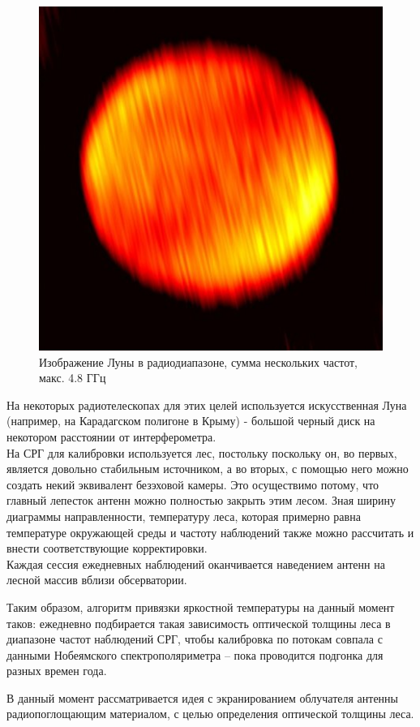 \begin{figure}[H]
	\centering
	\includegraphics[width=0.7\linewidth]{images/moon_radio}
	\caption{Изображение Луны в радиодиапазоне, сумма нескольких частот, макс. 4.8 ГГц}
	\label{fig:moon_radio}
\end{figure}

На некоторых радиотелескопах для этих целей используется искусственная Луна (например, на Карадагском полигоне в Крыму) - большой черный диск на некотором расстоянии от интерферометра.\\ На СРГ для калибровки используется лес, постольку поскольку он, во первых, является довольно стабильным источником, а во вторых, с помощью него можно создать некий эквивалент безэховой камеры. Это осуществимо потому, что главный лепесток антенн можно полностью закрыть этим лесом. Зная ширину диаграммы направленности, температуру леса, которая примерно равна температуре окружающей среды и частоту наблюдений также можно рассчитать и внести соответствующие корректировки.\\
Каждая сессия ежедневных наблюдений оканчивается наведением антенн на лесной массив вблизи обсерватории.

Таким образом, алгоритм привязки яркостной температуры на данный момент таков: ежедневно подбирается такая зависимость оптической толщины леса в диапазоне частот наблюдений СРГ, чтобы  калибровка по потокам совпала с данными Нобеямского спектрополяриметра -- пока проводится подгонка для разных времен года.

В данный момент рассматривается идея с экранированием облучателя антенны радиопоглощающим материалом, с целью определения оптической толщины леса.

